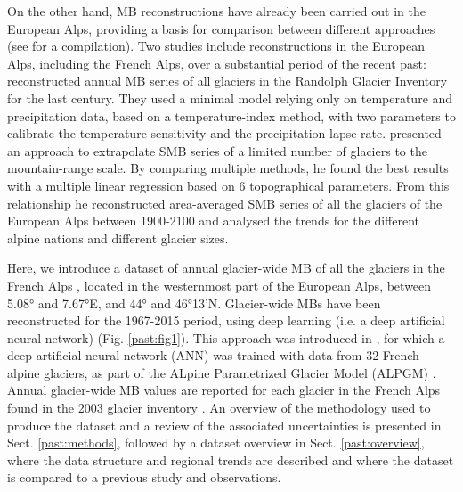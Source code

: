 On the other hand, MB reconstructions have already been carried out in the European Alps, providing a basis for comparison between different approaches (see \citet{hock_glaciermip_2019} for a compilation). Two studies include reconstructions in the European Alps, including the French Alps, over a substantial period of the recent past: \citet{marzeion_past_2012, marzeion_brief_2015} reconstructed annual MB series of all glaciers in the Randolph Glacier Inventory for the last century. They used a minimal model relying only on temperature and precipitation data, based on a temperature-index method, with two parameters to calibrate the temperature sensitivity and the precipitation lapse rate. \citet{huss_extrapolating_2012} presented an approach to extrapolate SMB series of a limited number of glaciers to the mountain-range scale. By comparing multiple methods, he found the best results with a multiple linear regression based on 6 topographical parameters. From this relationship he reconstructed area-averaged SMB series of all the glaciers of the European Alps between 1900-2100 and analysed the trends for the different alpine nations and different glacier sizes.

Here, we introduce a dataset of annual glacier-wide MB of all the glaciers in the French Alps \citep{bolibar_deep_2020}, located in the westernmost part of the European Alps, between 5.08° and 7.67°E, and 44° and 46°13’N. Glacier-wide MBs have been reconstructed for the 1967-2015 period, using deep learning (i.e. a deep artificial neural network) (Fig. \ref{past:fig1}). This approach was introduced in \citet{bolibar_deep_2020-1}, for which a deep artificial neural network (ANN) was trained with data from 32 French alpine glaciers, as part of the ALpine Parametrized Glacier Model (ALPGM) \citep{bolibar_alpgm_2020}. Annual glacier-wide MB values are reported for each glacier in the French Alps found in the 2003 glacier inventory \citep{gardent_multitemporal_2014}. An overview of the methodology used to produce the dataset and a review of the associated uncertainties is presented in Sect. \ref{past:methods}, followed by a dataset overview in Sect. \ref{past:overview}, where the data structure and regional trends are described and where the dataset is compared to a previous study and observations. 

